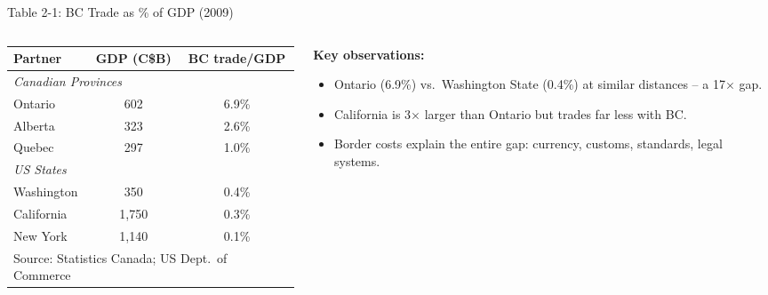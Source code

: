 \documentclass[aspectratio=169]{beamer}
\begin{document}
\begin{frame}{Table 2-1: BC Trade as \% of GDP (2009)}
\begin{columns}[T]
\begin{column}{0.52\textwidth}
\begin{center}
\begin{adjustbox}{max width=\columnwidth}
\begin{tabular}{lcc}
\toprule
\textbf{Partner} & \textbf{GDP (C\$B)} & \textbf{BC trade/GDP}\\
\midrule
\multicolumn{3}{l}{\small\textit{Canadian Provinces}}\\
Ontario       & 602 & 6.9\%\\
Alberta       & 323 & 2.6\%\\
Quebec        & 297 & 1.0\%\\
\midrule
\multicolumn{3}{l}{\small\textit{US States}}\\
Washington    & 350 & 0.4\%\\
California    & 1{,}750 & 0.3\%\\
New York      & 1{,}140 & 0.1\%\\
\bottomrule
\multicolumn{3}{l}{\scriptsize Source: Statistics Canada; US Dept.\ of Commerce}
\end{tabular}
\end{adjustbox}
\end{center}
\end{column}
\begin{column}{0.45\textwidth}
\textbf{Key observations:}
\begin{itemize}\small
  \item Ontario (6.9\%) vs.\ Washington State (0.4\%) at similar distances -- a 17$\times$ gap.
  \item California is 3$\times$ larger than Ontario but trades far less with BC.
  \item Border costs explain the entire gap: currency, customs, standards, legal systems.
\end{itemize}
\vspace{0.3em}

\end{column}
\end{columns}
\end{frame}
\end{document}
